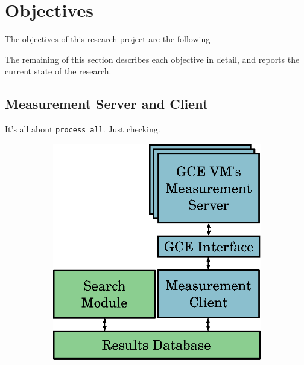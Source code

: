 \documentclass[a4paper, 12pt]{article}
\begin{document}
\section{Objectives} \label{sec:obj}

The objectives of this research project are the following

The remaining of this section describes each objective in detail,
and reports the current state of the research.

\subsection{Measurement Server and Client}

It's all about \texttt{\footnotesize process\_all}. Just checking.

\begin{figure}[htpb]
    \centering
    \begin{subfigure}{.45\textwidth}
        \centering
        \includegraphics[scale=.75]{high-level-implementation}
        \caption{}
        \label{fig:high-level}
    \end{subfigure}%
    \begin{subfigure}{.45\textwidth}
        \centering

\end{subfigure}
\end{figure}
\end{document}
